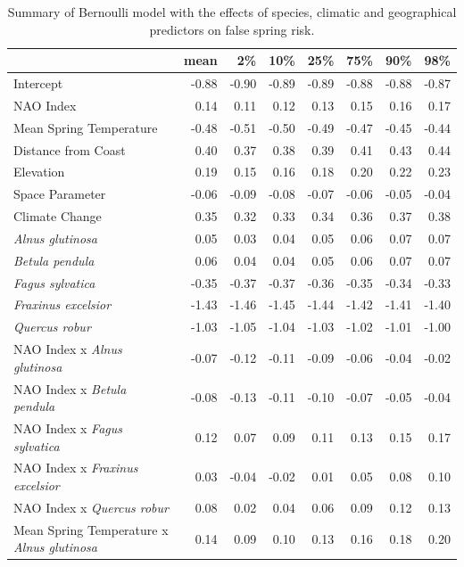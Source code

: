 \documentclass{article}\usepackage[]{graphicx}\usepackage[]{color}
\begin{document}
\newpage
\begin{longtable}{lrrrrrrr}
\caption{Summary of Bernoulli model with the effects of species, climatic and geographical predictors on false spring risk.} \\ 
  \hline
 & mean & 2\% & 10\% & 25\% & 75\% & 90\% & 98\% \\ 
  \hline \endhead  \hline
Intercept & -0.88 & -0.90 & -0.89 & -0.89 & -0.88 & -0.88 & -0.87 \\ 
  NAO Index & 0.14 & 0.11 & 0.12 & 0.13 & 0.15 & 0.16 & 0.17 \\ 
  Mean Spring 
Temperature & -0.48 & -0.51 & -0.50 & -0.49 & -0.47 & -0.45 & -0.44 \\ 
  Distance from 
Coast & 0.40 & 0.37 & 0.38 & 0.39 & 0.41 & 0.43 & 0.44 \\ 
  Elevation & 0.19 & 0.15 & 0.16 & 0.18 & 0.20 & 0.22 & 0.23 \\ 
  Space Parameter & -0.06 & -0.09 & -0.08 & -0.07 & -0.06 & -0.05 & -0.04 \\ 
  Climate Change & 0.35 & 0.32 & 0.33 & 0.34 & 0.36 & 0.37 & 0.38 \\ 
  \textit{Alnus glutinosa} & 0.05 & 0.03 & 0.04 & 0.05 & 0.06 & 0.07 & 0.07 \\ 
  \textit{Betula pendula} & 0.06 & 0.04 & 0.04 & 0.05 & 0.06 & 0.07 & 0.07 \\ 
  \textit{Fagus sylvatica} & -0.35 & -0.37 & -0.37 & -0.36 & -0.35 & -0.34 & -0.33 \\ 
  \textit{Fraxinus excelsior} & -1.43 & -1.46 & -1.45 & -1.44 & -1.42 & -1.41 & -1.40 \\ 
  \textit{Quercus robur} & -1.03 & -1.05 & -1.04 & -1.03 & -1.02 & -1.01 & -1.00 \\ 
  NAO Index
x\textit{ Alnus glutinosa} & -0.07 & -0.12 & -0.11 & -0.09 & -0.06 & -0.04 & -0.02 \\ 
  NAO Index
x\textit{ Betula pendula} & -0.08 & -0.13 & -0.11 & -0.10 & -0.07 & -0.05 & -0.04 \\ 
  NAO Index
x\textit{ Fagus sylvatica} & 0.12 & 0.07 & 0.09 & 0.11 & 0.13 & 0.15 & 0.17 \\ 
  NAO Index
x\textit{ Fraxinus excelsior} & 0.03 & -0.04 & -0.02 & 0.01 & 0.05 & 0.08 & 0.10 \\ 
  NAO Index
x\textit{ Quercus robur} & 0.08 & 0.02 & 0.04 & 0.06 & 0.09 & 0.12 & 0.13 \\ 
  Mean Spring 
Temperature
x\textit{ Alnus glutinosa} & 0.14 & 0.09 & 0.10 & 0.13 & 0.16 & 0.18 & 0.20 \\ 

\end{longtable}
\end{document}
